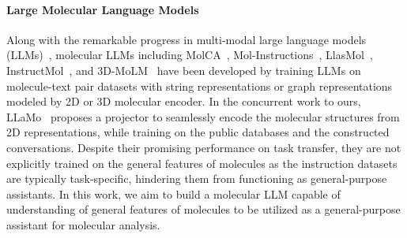 \paragraph{Large Molecular Language Models}
Along with the remarkable progress in multi-modal large language models (LLMs)~\cite{liu2024LLAVA,liu2024LLAVA1.5,xu2024llavacot}, molecular LLMs including MolCA~\cite{liu-etal-2023-molca}, Mol-Instructions~\cite{fang2023molinstruction},  LlasMol~\cite{yu2024llasmol}, InstructMol~\cite{cao2023instructmol}, and 3D-MoLM~\cite{li2024molm} have been developed by training LLMs on molecule-text pair datasets with string representations or graph representations modeled by 2D or 3D molecular encoder. In the concurrent work to ours, LLaMo~\cite{park2024llamo} proposes a projector to seamlessly encode the molecular structures from 2D representations, while training on the public databases and the constructed conversations. Despite their promising performance on task transfer, they are not explicitly trained on the general features of molecules as the instruction datasets are typically task-specific, hindering them from functioning as general-purpose assistants. In this work, we aim to build a molecular LLM capable of understanding of general features of molecules to be utilized as a general-purpose assistant for molecular analysis.
